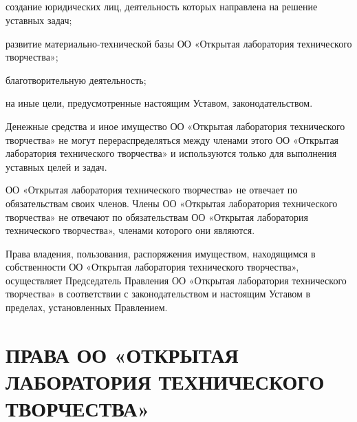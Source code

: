 \documentclass[a4paper,fontsize=14pt,titlepage]{scrartcl}
\makeatletter
\newenvironment{numberedpars}{%
  \addtocounter{secnumdepth}{1}
  \renewcommand\theparagraph{\arabic{section}.\arabic{paragraph}}
  \renewcommand\@seccntformat[1]
  {\expandafter\ifx\csname##1\endcsname\paragraph\csname 
  the##1\endcsname\else\csname the##1\endcsname\quad\fi}
  \let\old@par=\par
  \def\new@par{\let\par=\old@par\paragraph{}\let\par=\new@par}
  \let\par=\new@par
  \par
}{
  \addtocounter{secnumdepth}{-1}
}
\newenvironment{numberedsubpars}{%
  \addtocounter{secnumdepth}{1}
  \renewcommand\thesubparagraph{\arabic{section}.\arabic{paragraph}.\arabic{subparagraph}}
  \renewcommand\@seccntformat[1]
  {\expandafter\ifx\csname##1\endcsname\subparagraph\csname 
  the##1\endcsname\else\csname the##1\endcsname\quad\fi}
  \let\old@@par=\par
  \def\new@@par{\let\par=\old@par\subparagraph{}\let\par=\new@@par}
  \let\par=\new@@par
  \par
}{
  \addtocounter{secnumdepth}{-1}
  \let\par=\old@@par
}
\let\@@@section=\section
\renewcommand\section[1]{\@@@section{\MakeUppercase{#1}}}
\makeatother
\begin{document}
\begin{numberedpars}
\begin{numberedsubpars}
создание юридических лиц, деятельность которых направлена на решение уставных задач;

развитие материально-технической базы ОО «Открытая лаборатория технического творчества»;

благотворительную деятельность;

на иные цели, предусмотренные настоящим Уставом, законодательством.
\end{numberedsubpars}

Денежные средства и иное имущество ОО «Открытая лаборатория технического творчества» не могут перераспределяться между
членами этого ОО «Открытая лаборатория технического творчества» и используются только для выполнения уставных целей и
задач.

ОО «Открытая лаборатория технического творчества» не отвечает по обязательствам своих членов. Члены ОО «Открытая
лаборатория технического творчества» не отвечают по обязательствам ОО «Открытая лаборатория технического творчества»,
членами которого они являются.

Права владения, пользования, распоряжения имуществом, находящимся в собственности ОО «Открытая лаборатория технического
творчества», осуществляет Председатель Правления ОО «Открытая лаборатория технического творчества» в соответствии с
законодательством и настоящим Уставом в пределах, установленных Правлением. 
\end{numberedpars}

\section{Права ОО «Открытая лаборатория технического творчества»}
\end{document}
